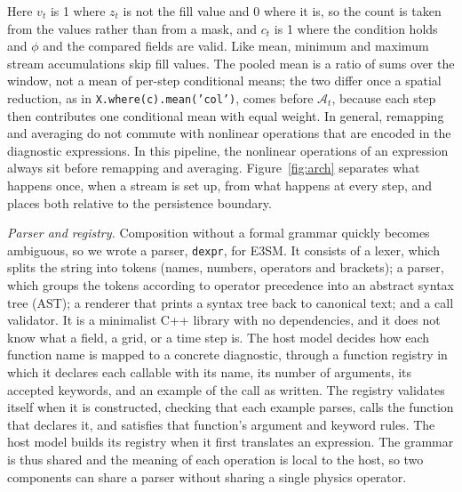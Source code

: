 \documentclass[gmd, manuscript]{copernicus}
\newcommand{\dexpr}{\texttt{dexpr}}
\begin{document}
Here $v_t$ is 1 where $z_t$ is not the fill value and 0 where it is, so the count is taken from the values rather than from a mask, and $c_t$ is 1 where the condition holds and $\phi$ and the compared fields are valid. Like mean, minimum and maximum stream accumulations skip fill values. The pooled mean is a ratio of sums over the window, not a mean of per-step conditional means; the two differ once a spatial reduction, as in \texttt{X.where(c).mean('col')}, comes before $\mathcal{A}_t$, because each step then contributes one conditional mean with equal weight. In general, remapping and averaging do not commute with nonlinear operations that are encoded in the diagnostic expressions. In this pipeline, the nonlinear operations of an expression always sit before remapping and averaging. Figure~\ref{fig:arch} separates what happens once, when a stream is set up, from what happens at every step, and places both relative to the persistence boundary.

\emph{Parser and registry.} Composition without a formal grammar quickly becomes ambiguous, so we wrote a parser, \dexpr, for E3SM. It consists of a lexer, which splits the string into tokens (names, numbers, operators and brackets); a \citet{pratt_top_1973} parser, which groups the tokens according to operator precedence into an abstract syntax tree (AST); a renderer that prints a syntax tree back to canonical text; and a call validator. It is a minimalist C++ library with no dependencies, and it does not know what a field, a grid, or a time step is. The host model decides how each function name is mapped to a concrete diagnostic, through a function registry in which it declares each callable with its name, its number of arguments, its accepted keywords, and an example of the call as written. The registry validates itself when it is constructed, checking that each example parses, calls the function that declares it, and satisfies that function's argument and keyword rules. The host model builds its registry when it first translates an expression. The grammar is thus shared and the meaning of each operation is local to the host, so two components can share a parser without sharing a single physics operator.
\end{document}
